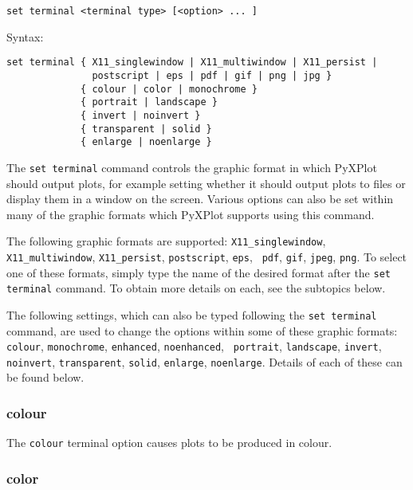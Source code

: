 \documentclass[a4paper,onecolumn,11pt]{book}
\begin{document}
\begin{verbatim}
set terminal <terminal type> [<option> ... ]
\end{verbatim}

Syntax:

\begin{verbatim}
set terminal { X11_singlewindow | X11_multiwindow | X11_persist | 
               postscript | eps | pdf | gif | png | jpg } 
             { colour | color | monochrome } 
             { portrait | landscape } 
             { invert | noinvert } 
             { transparent | solid }
             { enlarge | noenlarge }
\end{verbatim}

The {\tt set terminal} command controls the graphic format in which PyXPlot
should output plots, for example setting whether it should output plots to files
or display them in a window on the screen. Various options can also be set
within many of the graphic formats which PyXPlot supports using this command.

The following graphic formats are supported:  {\tt X11\_singlewindow},
\newline\noindent %
{\tt X11\_multiwindow}, {\tt X11\_persist}, {\tt postscript}, {\tt eps}, {\tt
pdf}, {\tt gif}, {\tt jpeg}, {\tt png}. To select one of these formats, simply
type the name of the desired format after the {\tt set terminal} command. To
obtain more details on each, see the subtopics below.

The following settings, which can also be typed following the {\tt set terminal}
command, are used to change the options within some of these graphic formats:
{\tt colour}, {\tt monochrome}, {\tt enhanced}, {\tt noenhanced}, {\tt
portrait}, {\tt landscape}, {\tt invert}, {\tt noinvert}, {\tt transparent},
{\tt solid}, {\tt enlarge}, {\tt noenlarge}. Details of each of these can be
found below.

\subsubsection{colour}

The {\tt colour} terminal option causes plots to be produced in colour.

\subsubsection{color}
\end{document}
